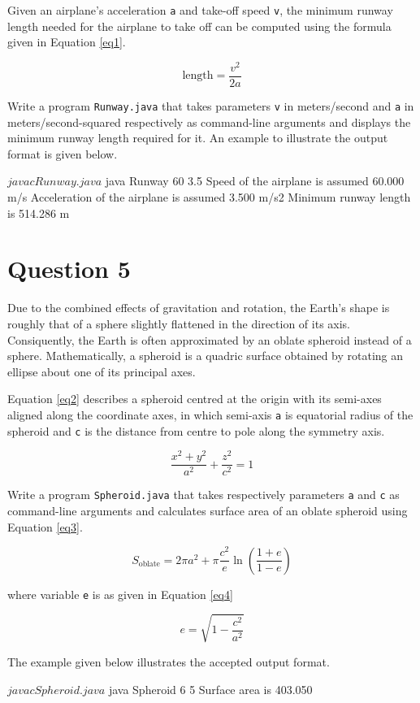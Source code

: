 \documentclass[12pt,letterpaper,twoside]{article}
\begin{document}
Given an airplane's acceleration \texttt{a} and take-off speed \texttt{v}, the minimum runway length needed for the airplane to take off can be computed using the formula given in Equation \ref{eq1}.

\begin{equation}
\textrm{length} = \frac{v^2}{2a}
\label{eq1}
\end{equation}

Write a program \texttt{Runway.java} that takes parameters \texttt{v} in meters/second and \texttt{a} in meters/second-squared respectively as command-line arguments and displays the minimum runway length required for it. An example to illustrate the output format is given below.

\begin{terminal}
$ javac Runway.java
$ java Runway 60 3.5
Speed of the airplane is assumed 60.000 m/s
Acceleration of the airplane is assumed 3.500 m/s2
Minimum runway length is 514.286 m
\end{terminal}

\section*{Question 5}

Due to the combined effects of gravitation and rotation, the Earth's shape is roughly that of a sphere slightly flattened in the direction of its axis. Consiquently, the Earth is often approximated by an oblate spheroid instead of a sphere. Mathematically, a spheroid is a quadric surface obtained by rotating an ellipse about one of its principal axes.

\newpage

Equation \ref{eq2} describes a spheroid centred at the origin with its semi-axes aligned along the coordinate axes, in which semi-axis \texttt{a} is equatorial radius of the spheroid and \texttt{c} is the distance from centre to pole along the symmetry axis.

\begin{equation}
\frac{x^2+y^2}{a^2} + \frac{z^2}{c^2} = 1
\label{eq2}
\end{equation}

Write a program \texttt{Spheroid.java} that takes respectively parameters \texttt{a} and \texttt{c} as command-line arguments and calculates surface area of an oblate spheroid using Equation \ref{eq3}.

\begin{equation}
S_{\text{oblate}} = 2\pi a^2 + \pi \frac{c^2}{e} \ln \left(\frac{1+e}{1-e} \right)
\label{eq3}
\end{equation}

where variable \texttt{e} is as given in Equation \ref{eq4}

\begin{equation}
e = \sqrt{1 - \frac{c^2}{a^2}}
\label{eq4}
\end{equation}

The example given below illustrates the accepted output format.

\begin{terminal}
$ javac Spheroid.java
$ java Spheroid 6 5
Surface area is 403.050
\end{terminal}

\end{document}
